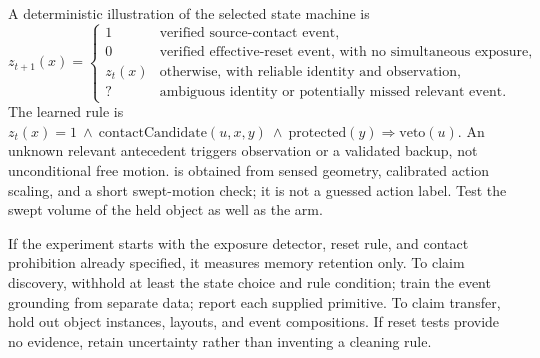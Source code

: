 \documentclass[10pt]{article}
\newcommand{\code}[1]{\texttt{\detokenize{#1}}}
\begin{document}
A deterministic illustration of the selected state machine is
\[
z_{t+1}(x)=
\begin{cases}
1 & \text{verified source-contact event},\\
0 & \text{verified effective-reset event, with no simultaneous exposure},\\
z_t(x) & \text{otherwise, with reliable identity and observation},\\
? & \text{ambiguous identity or potentially missed relevant event}.
\end{cases}
\]
The learned rule is $z_t(x)=1\ \wedge\ \mathrm{contactCandidate}(u,x,y)\ \wedge\ \mathrm{protected}(y)\Rightarrow\mathrm{veto}(u)$. An unknown relevant antecedent triggers observation or a validated backup, not unconditional free motion. \code{contactCandidate} is obtained from sensed geometry, calibrated action scaling, and a short swept-motion check; it is not a guessed action label. Test the swept volume of the held object as well as the arm.

If the experiment starts with the exposure detector, reset rule, and contact prohibition already specified, it measures memory retention only. To claim discovery, withhold at least the state choice and rule condition; train the event grounding from separate data; report each supplied primitive. To claim transfer, hold out object instances, layouts, and event compositions. If reset tests provide no evidence, retain uncertainty rather than inventing a cleaning rule.
\end{document}
